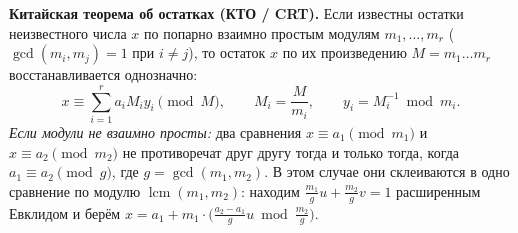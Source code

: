 \documentclass[10pt,a4paper]{article}
\DeclareMathOperator{\lcm}{lcm}
\begin{document}
\textbf{Китайская теорема об остатках (КТО / CRT).} Если известны остатки неизвестного числа $x$ по попарно взаимно простым модулям $m_1, \dots, m_r$ ($\gcd(m_i, m_j) = 1$ при $i \ne j$), то остаток $x$ по их произведению $M = m_1 \dots m_r$ восстанавливается однозначно:
\[
  x \equiv \sum_{i=1}^{r} a_i M_i y_i \pmod M, \qquad M_i = \frac{M}{m_i}, \qquad y_i = M_i^{-1} \bmod m_i.
\]
\emph{Если модули не взаимно просты:} два сравнения $x \equiv a_1 \pmod{m_1}$ и $x \equiv a_2 \pmod{m_2}$ не противоречат друг другу тогда и только тогда, когда $a_1 \equiv a_2 \pmod g$, где $g = \gcd(m_1, m_2)$. В этом случае они склеиваются в одно сравнение по модулю $\lcm(m_1, m_2)$: находим $\frac{m_1}{g} u + \frac{m_2}{g} v = 1$ расширенным Евклидом и берём $x = a_1 + m_1 \cdot \bigl(\frac{a_2 - a_1}{g} u \bmod \frac{m_2}{g}\bigr)$.
\end{document}
